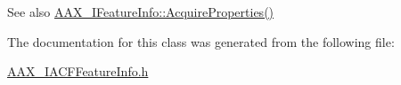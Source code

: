 \begin{DoxySeeAlso}{See also}
\hyperlink{a00100_ab74a4576cd4e87baa01d046dfa0c752e}{A\+A\+X\+\_\+\+I\+Feature\+Info\+::\+Acquire\+Properties()} 
\end{DoxySeeAlso}


The documentation for this class was generated from the following file\+:\begin{DoxyCompactItemize}
\item 
\hyperlink{a00225}{A\+A\+X\+\_\+\+I\+A\+C\+F\+Feature\+Info.\+h}\end{DoxyCompactItemize}
